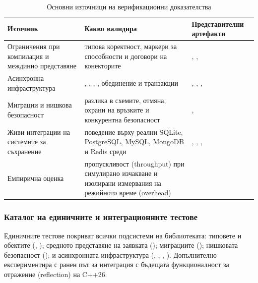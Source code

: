 \begin{table}[H]
\centering
\small
\caption{Основни източници на верификационни доказателства}
\label{tab:evidence_matrix}
\begin{tabularx}{\textwidth}{L{3.1cm}L{4.8cm}Z}
\toprule
\textbf{Източник} & \textbf{Какво валидира} & \textbf{Представителни артефакти} \\
\midrule
Ограничения при компилация и междинно представяне & типова коректност, маркери за способности и договори на конекторите & , ,  \\
\hdashline
Асинхронна инфраструктура & , , , , обединение и транзакции & , , ,  \\
\hdashline
Миграции и нишкова безопасност & разлика в схемите, отмяна, охрани на връзките и конкурентна безопасност & ,  \\
\hdashline
Живи интеграции на системите за съхранение & поведение върху реални SQLite, PostgreSQL, MySQL, MongoDB и Redis среди & , , ,  \\
\hdashline
Емпирична оценка & пропускливост (throughput) при симулирано изчакване и изолирани измервания на режийното време (overhead) &  \\
\bottomrule
\end{tabularx}
\end{table}

\subsubsection{Каталог на единичните и интеграционните тестове}

Единичните тестове покриват всички подсистеми на библиотеката: типовете и обектите (, ); средното представяне на заявката (); миграциите (); нишковата безопасност (); и асинхронната инфраструктура (, , , ). Допълнително  експериментира с ранен път за интеграция с бъдещата функционалност за отражение (reflection) на C++26.

